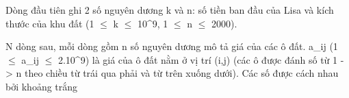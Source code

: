Dòng đầu tiên ghi 2 số nguyên dương k và n: số tiền ban đầu của Lisa và kích thước của khu đất (1  $\le$  k  $\le$  10^9, 1  $\le$  n  $\le$  2000).  

   N dòng sau, mỗi dòng gồm n số nguyên dương mô tả giá của các ô đất. a\_ij (1  $\le$  a­\_ij  $\le$  2.10^9) là giá của ô đất nằm ở vị trí (i,j) (các ô được đánh số từ 1 -> n theo chiều từ trái qua phải và từ trên xuống dưới). Các số được cách nhau bởi khoảng trắng